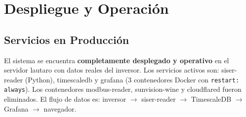\documentclass[12pt,a4paper]{article}
\begin{document}
\section{Despliegue y Operaci\'on}

\subsection{Servicios en Producci\'on}

El sistema se encuentra \textbf{completamente desplegado y operativo} en el servidor lautaro con datos reales del inversor. Los servicios activos son: siser-reader (Python), timescaledb y grafana (3 contenedores Docker con \texttt{restart: always}). Los contenedores modbus-reader, sunvision-wine y cloudflared fueron eliminados. El flujo de datos es: inversor $\rightarrow$ siser-reader $\rightarrow$ TimescaleDB $\rightarrow$ Grafana $\rightarrow$ navegador.
\end{document}
